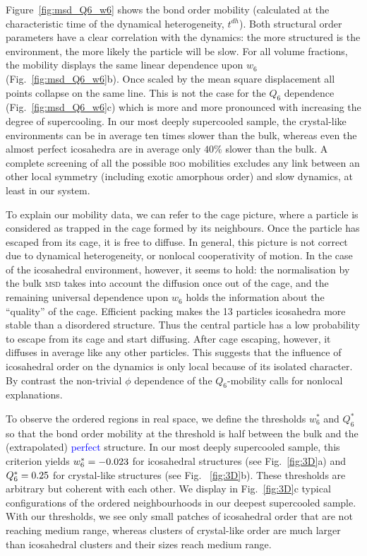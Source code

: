 Figure~\ref{fig:msd_Q6_w6} shows the bond order mobility (calculated at the characteristic time of the dynamical heterogeneity, $t^{dh}$). Both structural order parameters have a clear correlation with the dynamics: the more structured is the environment, the more likely the particle will be slow. For all volume fractions, the mobility displays the same linear dependence upon $w_6$ (Fig.~\ref{fig:msd_Q6_w6}b). Once scaled by the mean square displacement all points collapse on the same line. This is not the case for the $Q_6$ dependence (Fig.~\ref{fig:msd_Q6_w6}c) which is more and more pronounced with increasing the degree of supercooling. In our most deeply supercooled sample, the crystal-like environments can be in average ten times slower than the bulk, whereas even the almost perfect icosahedra are in average only $40\%$ slower than the bulk. A complete screening of all the possible \textsc{boo} mobilities excludes any link between an other local symmetry (including exotic amorphous order) and slow dynamics, at least in our system.

To explain our mobility data, we can refer to the cage picture, where a particle is considered as trapped in the cage formed by its neighbours. Once the particle has escaped from its cage, it is free to diffuse. In general, this picture is not correct due to dynamical heterogeneity, or nonlocal cooperativity of motion. In the case of the icosahedral environment, however, it seems to hold: the normalisation by the bulk \textsc{msd} takes into account the diffusion once out of the cage, and the remaining universal dependence upon $w_6$ holds the information about the ``quality'' of the cage. Efficient packing makes the 13 particles icosahedra more stable than a disordered structure. Thus the central particle has a low probability to escape from its cage and start diffusing. After cage escaping, however, it diffuses in average like any other particles. This suggests that the influence of icosahedral order on the dynamics is only local because of its isolated character. By contrast the non-trivial $\phi$ dependence of the $Q_6$-mobility calls for nonlocal explanations.

To observe the ordered regions in real space, we define the thresholds $w_6^*$ and $Q_6^*$ so that the bond order mobility at the threshold is half between the bulk and the (extrapolated) \textcolor{blue}{perfect} structure. In our most deeply supercooled sample, this criterion yields $w_6^* = -0.023$ for icosahedral structures (see Fig.~\ref{fig:3D}a) and $Q_6^* = 0.25$ for crystal-like structures (see Fig. ~\ref{fig:3D}b). These thresholds are arbitrary but coherent with each other. We display in Fig.~\ref{fig:3D}c typical configurations of the ordered neighbourhoods in our deepest supercooled sample. With our thresholds, we see only small patches of icosahedral order that are not reaching medium range, whereas clusters of crystal-like order are much larger than icosahedral clusters and their sizes reach medium range. 



